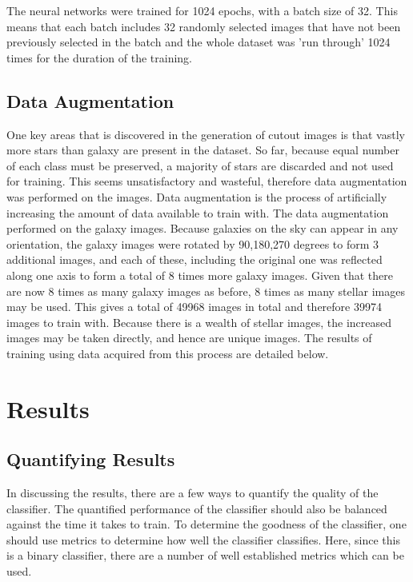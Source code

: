 \documentclass[a4paper,fleqn,usenatbib]{mnras}
\begin{document}
The neural networks were trained for 1024 epochs, with a batch size of 32. This means that each batch includes 32 randomly selected images that have not been previously selected in the batch and the whole dataset was 'run through' 1024 times for the duration of the training. 

\subsection{Data Augmentation}
One key areas that is discovered in the generation of cutout images is that vastly more stars than galaxy are present in the dataset. So far, because equal number of each class must be preserved, a majority of stars are discarded and not used for training. This seems unsatisfactory and wasteful, therefore data augmentation was performed on the images. Data augmentation is the process of artificially increasing the amount of data available to train with. The data augmentation performed on the galaxy images. Because galaxies on the sky can appear in any orientation, the galaxy images were rotated by 90,180,270 degrees to form 3 additional images, and each of these, including the original one was reflected along one axis to form a total of 8 times more galaxy images. Given that there are now 8 times as many galaxy images as before, 8 times as many stellar images may be used. This gives a total of 49968 images in total and therefore 39974 images to train with. Because there is a wealth of stellar images, the increased images may be taken directly, and hence are unique images. The results of training using data acquired from this process are detailed below. 
\section{Results}
\subsection{Quantifying Results}
In discussing the results, there are a few ways to quantify the quality of the classifier. The quantified performance of the classifier should also be balanced against the time it takes to train. To determine the goodness of the classifier, one should use metrics to determine how well the classifier classifies. Here, since this is a binary classifier, there are a  number of well established metrics which can be used. 
\end{document}
